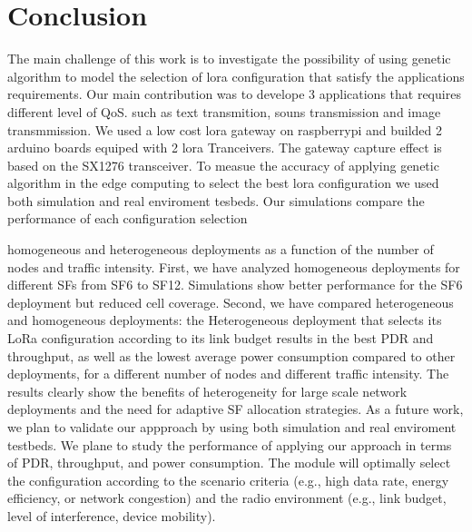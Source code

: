 \section{Conclusion} \label{sec:Conclusion}

The main challenge of this work is to investigate the possibility of using genetic algorithm to model the selection of lora configuration that satisfy the applications requirements.
Our main contribution was to develope 3 applications that requires different level of QoS.
such as text transmition, souns transmission and image transmmission. We used a low cost lora gateway on raspberrypi and builded 2 arduino boards equiped with 2 lora Tranceivers.
The gateway capture effect is based on the SX1276 transceiver.
To measue the accuracy of applying genetic algorithm in the edge computing to select the best lora configuration we used both simulation and real enviroment tesbeds.
Our simulations compare the performance of each configuration selection 


homogeneous and heterogeneous deployments as a function of the number of nodes and traffic intensity.
First,
	we have analyzed homogeneous deployments for different SFs from SF6 to SF12.
Simulations show better performance for the SF6 deployment but reduced cell coverage.
Second,
	we have compared heterogeneous and homogeneous deployments:
	the Heterogeneous deployment that selects its LoRa configuration according to its link budget results in the best PDR and throughput,
	as well as the lowest average power consumption compared to other deployments,
	for a different number of nodes and different traffic intensity.
The results clearly show the benefits of heterogeneity for large scale network deployments and the need for adaptive SF allocation strategies.
As a future work,
	we plan to validate our appproach by using both simulation and real enviroment testbeds. 
We plane to study the performance of applying our approach in terms of PDR,
	throughput,
	and power consumption.
The module will optimally select the configuration according to the scenario criteria (e.g.,
	high data rate,
	energy efficiency,
	or network congestion) and the radio environment (e.g.,
	link budget,
	level of interference,
	device mobility).

